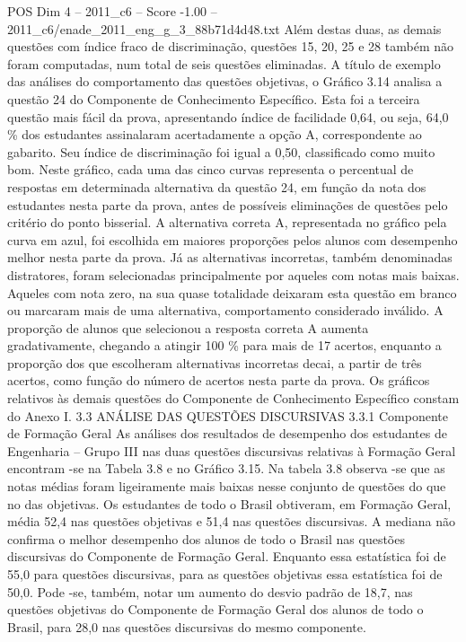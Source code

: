 \begin{textsample}{POS Dim 4 – 2011\_c6 – Score -1.00 – 2011\_c6/enade\_2011\_eng\_g\_3\_88b71d4d48.txt}
Além destas duas, as demais questões com índice fraco de discriminação, questões 15, 20, 25 e 28 também não foram computadas, num total de seis questões eliminadas.
A título de exemplo das análises do comportamento das questões objetivas, o Gráfico 3.14 analisa a questão 24 do Componente de Conhecimento Específico.
Esta foi a terceira questão mais fácil da prova, apresentando índice de facilidade 0,64, ou seja, 64,0 \% dos estudantes assinalaram acertadamente a opção A, correspondente ao gabarito.
Seu índice de discriminação foi igual a 0,50, classificado como muito bom.
Neste gráfico, cada uma das cinco curvas representa o percentual de respostas em determinada alternativa da questão 24, em função da nota dos estudantes nesta parte da prova, antes de possíveis eliminações de questões pelo critério do ponto bisserial.
A alternativa correta A, representada no gráfico pela curva em azul, foi escolhida em maiores proporções pelos alunos com desempenho melhor nesta parte da prova.
Já as alternativas incorretas, também denominadas distratores, foram selecionadas principalmente por aqueles com notas mais baixas.
Aqueles com nota zero, na sua quase totalidade deixaram esta questão em branco ou marcaram mais de uma alternativa, comportamento considerado inválido.
A proporção de alunos que selecionou a resposta correta A aumenta gradativamente, chegando a atingir 100 \% para mais de 17 acertos, enquanto a proporção dos que escolheram alternativas incorretas decai, a partir de três acertos, como função do número de acertos nesta parte da prova.
Os gráficos relativos às demais questões do Componente de Conhecimento Específico constam do Anexo I. 3.3 ANÁLISE DAS QUESTÕES DISCURSIVAS 3.3.1 Componente de Formação Geral As análises dos resultados de desempenho dos estudantes de Engenharia – Grupo III nas duas questões discursivas relativas à Formação Geral encontram -se na Tabela 3.8 e no Gráfico 3.15.
Na tabela 3.8 observa -se que as notas médias foram ligeiramente mais baixas nesse conjunto de questões do que no das objetivas.
Os estudantes de todo o Brasil obtiveram, em Formação Geral, média 52,4 nas questões objetivas e 51,4 nas questões discursivas.
A mediana não confirma o melhor desempenho dos alunos de todo o Brasil nas questões discursivas do Componente de Formação Geral.
Enquanto essa estatística foi de 55,0 para questões discursivas, para as questões objetivas essa estatística foi de 50,0.
Pode -se, também, notar um aumento do desvio padrão de 18,7, nas questões objetivas do Componente de Formação Geral dos alunos de todo o Brasil, para 28,0 nas questões discursivas do mesmo componente.

\end{textsample}
